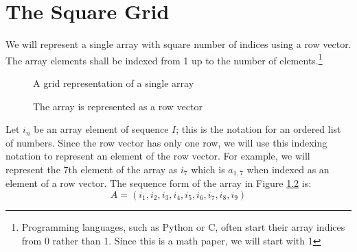 \documentclass[letterpaper, twoside,12pt]{book}
\begin{document}
    \chapter{The Square Grid} \label{1_square_grid}
    We will represent a single array with square number of indices using a row vector. The array elements shall be indexed from 1 up to the number of elements.\footnote{Programming languages, such as Python or C, often start their array indices from 0 rather than 1. Since this is a math paper, we will start with 1}
    \begin{figure}[ht]
    \centering
    \caption{A grid representation of a single array} \label{1f1}
    \end{figure}

    \begin{figure}[ht]
        \centering
        \caption{The array is represented as a row vector} \label{row_vector_form}
    \end{figure}

    Let $i_n$ be an array element of sequence $I$; this is the notation for an ordered list of numbers. Since the row vector has only one row, we will use this indexing notation to represent an element of the row vector. For example, we will represent the 7th element of the array as $i_7$ which is $a_{1,7}$ when indexed as an element of a row vector. The sequence form of the array in Figure \ref{row_vector_form} is:
    \begin{equation}
        A = (i_1,i_2,i_3,i_4,i_5,i_6,i_7,i_8,i_9)
    \end{equation}
\end{document}
